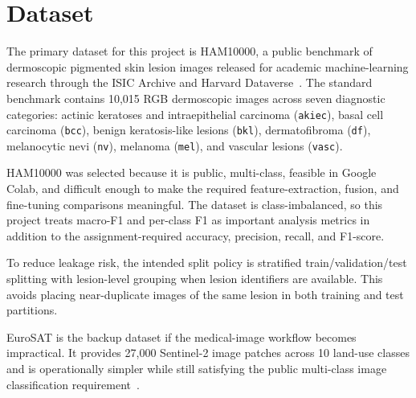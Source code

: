 \section{Dataset}

The primary dataset for this project is HAM10000, a public benchmark of dermoscopic pigmented skin lesion images released for academic machine-learning research through the ISIC Archive and Harvard Dataverse~\cite{tschandl2018ham10000}. The standard benchmark contains 10,015 RGB dermoscopic images across seven diagnostic categories: actinic keratoses and intraepithelial carcinoma (\texttt{akiec}), basal cell carcinoma (\texttt{bcc}), benign keratosis-like lesions (\texttt{bkl}), dermatofibroma (\texttt{df}), melanocytic nevi (\texttt{nv}), melanoma (\texttt{mel}), and vascular lesions (\texttt{vasc}).

HAM10000 was selected because it is public, multi-class, feasible in Google Colab, and difficult enough to make the required feature-extraction, fusion, and fine-tuning comparisons meaningful. The dataset is class-imbalanced, so this project treats macro-F1 and per-class F1 as important analysis metrics in addition to the assignment-required accuracy, precision, recall, and F1-score.

To reduce leakage risk, the intended split policy is stratified train/validation/test splitting with lesion-level grouping when lesion identifiers are available. This avoids placing near-duplicate images of the same lesion in both training and test partitions.

EuroSAT is the backup dataset if the medical-image workflow becomes impractical. It provides 27,000 Sentinel-2 image patches across 10 land-use classes and is operationally simpler while still satisfying the public multi-class image classification requirement~\cite{helber2019eurosat}.
